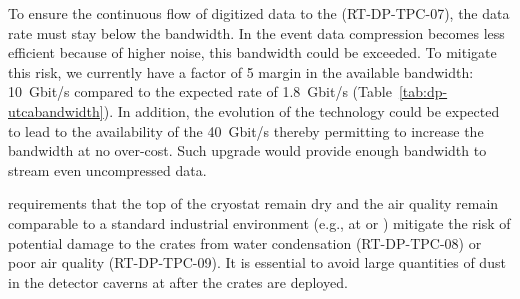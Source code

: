 To ensure the continuous flow of digitized data to the  (RT-DP-TPC-07), the data rate must stay below the  bandwidth. In the event data compression becomes less efficient because of higher noise, this bandwidth could be exceeded. To mitigate this risk, we currently have a factor of \num{5} margin in the available bandwidth: \SI{10}{Gbit/s}  compared to the expected rate of \SI{1.8}{Gbit/s} (Table~\ref{tab:dp-utcabandwidth}). In addition, the evolution of the technology could be expected to lead to the availability of the \SI{40}{Gbit/s}  thereby permitting to increase the bandwidth at no over-cost. Such upgrade would provide enough bandwidth to stream even uncompressed data.

 requirements that the top of the cryostat remain dry and the air quality remain comparable to a standard industrial environment (e.g., at  or ) mitigate the risk of potential damage to the  crates from water condensation (RT-DP-TPC-08) or poor air quality (RT-DP-TPC-09). It is essential to avoid large quantities of dust in the detector caverns at  after the  crates are deployed.
